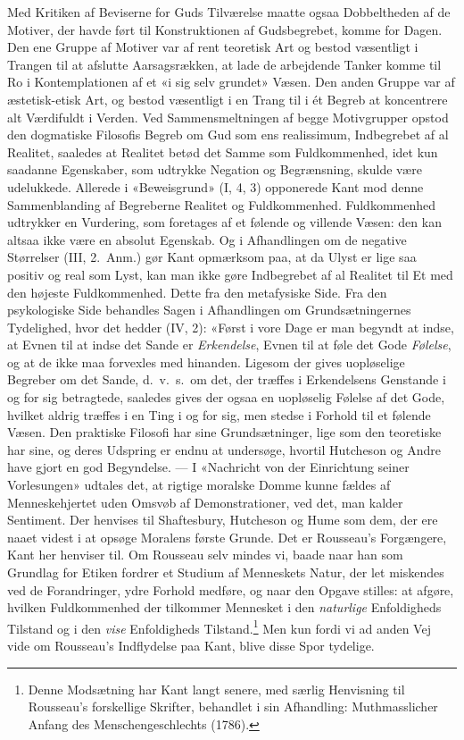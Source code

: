 \documentclass[12pt,a4paper]{article}
\newcommand{\apage}[1]{\marginnote{\footnotesize\textit{[#1]}}}
\begin{document}
Med Kritiken af Beviserne for Guds Tilværelse maatte ogsaa Dobbeltheden
af de Motiver, der havde ført til Konstruktionen af Gudsbegrebet, komme
for Dagen. Den ene Gruppe af Motiver var af rent teoretisk Art og bestod
væsentligt i Trangen til at afslutte Aarsagsrækken, at lade de arbejdende
Tanker komme til Ro i Kontemplationen af et «i sig selv grundet» Væsen.
Den anden Gruppe var af æstetisk-etisk Art, og bestod væsentligt i en
Trang til i ét Begreb at koncentrere alt Værdifuldt i Verden. Ved
Sammensmeltningen af begge Motivgrupper opstod den dogmatiske Filosofis
Begreb om Gud som ens realissimum, Indbegrebet af al Realitet,
saaledes at Realitet betød det Samme som Fuldkommenhed, idet kun saadanne
Egenskaber, som udtrykke Negation og Begrænsning, skulde være udelukkede.
Allerede i «Beweisgrund» (I, 4, 3) opponerede Kant mod denne
Sammenblanding af Begreberne Realitet og Fuldkommenhed. Fuldkommenhed
udtrykker en Vurdering, som foretages af et følende og villende Væsen:
den kan altsaa ikke være en absolut Egenskab. Og i Afhandlingen om de
negative Størrelser (III, 2.\ Anm.) gør Kant opmærksom paa, at da Ulyst
er lige saa positiv og real som Lyst, kan man ikke gøre Indbegrebet af al
Realitet til Et med den højeste Fuldkommenhed. Dette fra den metafysiske
Side. Fra den psykologiske Side behandles Sagen i Afhandlingen om
Grundsætningernes Tydelighed, hvor det hedder (IV, 2): «Først i vore Dage
er man begyndt at indse, at Evnen til at indse det Sande er \emph{Erkendelse},
Evnen til at føle det Gode \emph{Følelse}, og at de ikke maa forvexles med
hinanden. Ligesom der gives uopløselige Begreber om det Sande, d.\ v.\
s.\ om det, der træffes i Erkendelsens Genstande i og for sig \apage{38} betragtede,
saaledes gives der ogsaa en uopløselig Følelse af det Gode, hvilket aldrig
træffes i en Ting i og for sig, men stedse i Forhold til et følende
Væsen. Den praktiske Filosofi har sine Grundsætninger, lige som den
teoretiske har sine, og deres Udspring er endnu at undersøge, hvortil
Hutcheson og Andre have gjort en god Begyndelse. --- I «Nachricht von
der Einrichtung seiner Vorlesungen» udtales det, at rigtige moralske
Domme kunne fældes af Menneskehjertet uden Omsvøb af Demonstrationer, ved
det, man kalder Sentiment. Der henvises til Shaftesbury, Hutcheson og
Hume som dem, der ere naaet videst i at opsøge Moralens første Grunde.
Det er Rousseau's Forgængere, Kant her henviser til. Om Rousseau selv
mindes vi, baade naar han som Grundlag for Etiken fordrer et Studium af
Menneskets Natur, der let miskendes ved de Forandringer, ydre Forhold
medføre, og naar den Opgave stilles: at afgøre, hvilken Fuldkommenhed der
tilkommer Mennesket i den \emph{naturlige} Enfoldigheds Tilstand og i den \emph{vise}
Enfoldigheds Tilstand.\footnote{Denne Modsætning har Kant langt senere,
med særlig Henvisning til Rousseau's forskellige Skrifter, behandlet i
sin Afhandling: Muthmasslicher Anfang des Menschengeschlechts
(1786).} Men kun fordi vi ad anden Vej vide om Rousseau's Indflydelse paa
Kant, blive disse Spor tydelige.
\end{document}
